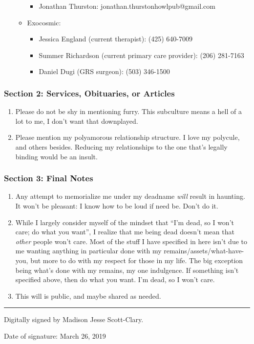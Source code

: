 \begin{enumerate}
\begin{itemize}
    \begin{itemize}
    \tightlist
    \item
      Jonathan Thurston: jonathan.thurstonhowlpub@gmail.com
    \end{itemize}
  \item
    Exocosmic:

    \begin{itemize}
    \tightlist
    \item
      Jessica England (current therapist): (425) 640-7009
    \item
      Summer Richardson (current primary care provider): (206) 281-7163
    \item
      Daniel Dugi (GRS surgeon): (503) 346-1500
    \end{itemize}
  \end{itemize}
\end{enumerate}

\subsubsection*{Section 2: Services, Obituaries, or Articles}\label{section-2-services-obituaries-or-articles}

\begin{enumerate}
\def\labelenumi{\arabic{enumi}.}
\tightlist
\item
  Please do not be shy in mentioning furry. This subculture means a hell of a lot to me, I don't want that downplayed.
\item
  Please mention my polyamorous relationship structure. I love my polycule, and others besides. Reducing my relationships to the one that's legally binding would be an insult.
\end{enumerate}

\subsubsection*{Section 3: Final Notes}\label{section-3-final-notes}

\begin{enumerate}
\def\labelenumi{\arabic{enumi}.}
\tightlist
\item
  Any attempt to memorialize me under my deadname \emph{will} result in haunting. It won't be pleasant: I know how to be loud if need be. Don't do it.
\item
  While I largely consider myself of the mindset that ``I'm dead, so I won't care; do what you want'', I realize that me being dead doesn't mean that \emph{other} people won't care. Most of the stuff I have specified in here isn't due to me wanting anything in particular done with my remains/assets/what-have-you, but more to do with my respect for those in my life. The big exception being what's done with my remains, my one indulgence. If something isn't specified above, then do what you want. I'm dead, so I won't care.
\item
  This will is public, and maybe shared as needed.
\end{enumerate}

\begin{center}\rule{0.5\linewidth}{\linethickness}\end{center}

Digitally signed by Madison Jesse Scott-Clary.

Date of signature: March 26, 2019
